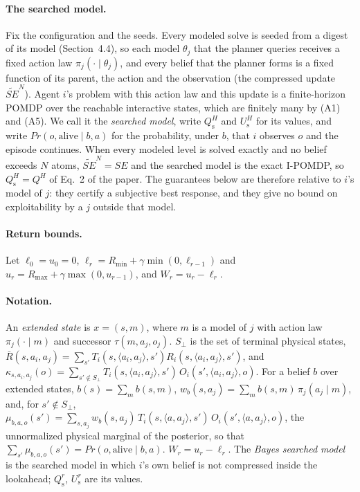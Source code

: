 \documentclass{article}
\newcommand{\SE}{\mathit{SE}}
\newcommand{\SEN}{\widetilde{\SE}^{N}}
\renewcommand{\Pr}{\mathit{Pr}}
\begin{document}
\paragraph{The searched model.} Fix the configuration and the seeds. Every modeled solve is seeded from a digest of its model (Section~4.4), so each model $\theta_j$ that the planner queries receives a fixed action law $\pi_j(\cdot \mid \theta_j)$, and every belief that the planner forms is a fixed function of its parent, the action and the observation (the compressed update $\SEN$). Agent $i$'s problem with this action law and this update is a finite-horizon POMDP over the reachable interactive states, which are finitely many by (A1) and (A5). We call it the \emph{searched model}, write $Q^H_{\mathrm{s}}$ and $U^H_{\mathrm{s}}$ for its values, and write $\Pr(o, \mathrm{alive} \mid b, a)$ for the probability, under $b$, that $i$ observes $o$ and the episode continues. When every modeled level is solved exactly and no belief exceeds $N$ atoms, $\SEN = \SE$ and the searched model is the exact I-POMDP, so $Q^H_{\mathrm{s}} = Q^H$ of Eq.~2 of the paper. The guarantees below are therefore relative to $i$'s model of $j$: they certify a subjective best response, and they give no bound on exploitability by a $j$ outside that model.

\paragraph{Return bounds.} Let $\ell_0 = u_0 = 0$, $\ell_r = R_{\min} + \gamma \min(0, \ell_{r-1})$ and $u_r = R_{\max} + \gamma \max(0, u_{r-1})$, and $W_r = u_r - \ell_r$.

\paragraph{Notation.} An \emph{extended state} is $x=(s,m)$, where $m$ is a model of $j$ with action law
$\pi_j(\cdot\mid m)$ and successor $\tau(m,a_j,o_j)$. $S_\bot$ is the set of terminal physical states,
$\bar R(s,a_i,a_j)=\sum_{s'}T_i(s,\langle a_i,a_j\rangle,s')R_i(s,\langle a_i,a_j\rangle,s')$, and
$\kappa_{s,a_i,a_j}(o)=\sum_{s'\notin S_\bot}T_i(s,\langle a_i,a_j\rangle,s')\,O_i(s',\langle a_i,a_j\rangle,o)$.
For a belief $b$ over extended states, $b(s)=\sum_m b(s,m)$,
$w_b(s,a_j)=\sum_{m}b(s,m)\,\pi_j(a_j\mid m)$, and, for $s'\notin S_\bot$,
$\mu_{b,a,o}(s')=\sum_{s,a_j}w_b(s,a_j)\,T_i(s,\langle a,a_j\rangle,s')\,O_i(s',\langle a,a_j\rangle,o)$,
the unnormalized physical marginal of the posterior, so that
$\sum_{s'}\mu_{b,a,o}(s')=\Pr(o,\mathrm{alive}\mid b,a)$. $W_r=u_r-\ell_r$.
The \emph{Bayes searched model} is the searched model in which $i$'s own belief is not compressed
inside the lookahead; $Q^r_{\mathrm s}$, $U^r_{\mathrm s}$ are its values.
\end{document}

